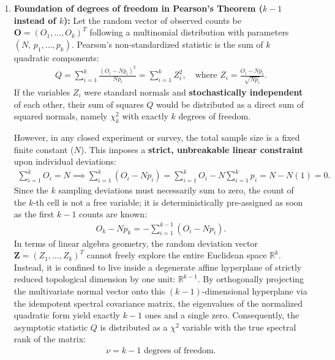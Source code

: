 \begin{solproblema}
	\begin{enumerate}
		\item \textbf{Foundation of degrees of freedom in Pearson's Theorem ($k-1$ instead of $k$):}
		Let the random vector of observed counts be $\mathbf{O} = (O_1, \dots, O_k)^T$ following a multinomial distribution with parameters $(N, \, p_1, \dots, p_k)$. Pearson's non-standardized statistic is the sum of $k$ quadratic components:
		\begin{align}
			Q = \sum_{i=1}^k \frac{(O_i - Np_i)^2}{Np_i} = \sum_{i=1}^k Z_i^2, \quad \text{where } Z_i = \frac{O_i - Np_i}{\sqrt{Np_i}}.
		\end{align}
		If the variables $Z_i$ were standard normals and \textbf{stochastically independent} of each other, their sum of squares $Q$ would be distributed as a direct sum of squared normals, namely $\chi^2_k$ with exactly $k$ degrees of freedom.
		
		However, in any closed experiment or survey, the total sample size is a fixed finite constant ($N$). This imposes a \textbf{strict, unbreakable linear constraint} upon individual deviations:
		\begin{align}
			\sum_{i=1}^k O_i = N \implies \sum_{i=1}^k (O_i - Np_i) = \sum_{i=1}^k O_i - N \sum_{i=1}^k p_i = N - N(1) = 0.
		\end{align}
		Since the $k$ sampling deviations must necessarily sum to zero, the count of the $k$-th cell is not a free variable; it is deterministically pre-assigned as soon as the first $k-1$ counts are known:
		\begin{align}
			O_k - Np_k = -\sum_{i=1}^{k-1} (O_i - Np_i).
		\end{align}
		In terms of linear algebra geometry, the random deviation vector $\mathbf{Z} = (Z_1, \dots, Z_k)^T$ cannot freely explore the entire Euclidean space $\mathbb{R}^k$. Instead, it is confined to live inside a degenerate affine hyperplane of strictly reduced topological dimension by one unit: $\mathbb{R}^{k-1}$.
		By orthogonally projecting the multivariate normal vector onto this $(k-1)$-dimensional hyperplane via the idempotent spectral covariance matrix, the eigenvalues of the normalized quadratic form yield exactly $k-1$ ones and a single zero. Consequently, the asymptotic statistic $Q$ is distributed as a $\chi^2$ variable with the true spectral rank of the matrix:
		\begin{align}
			\nu = k - 1 \text{ degrees of freedom.}
		\end{align}
		

\end{enumerate}
\end{solproblema}
